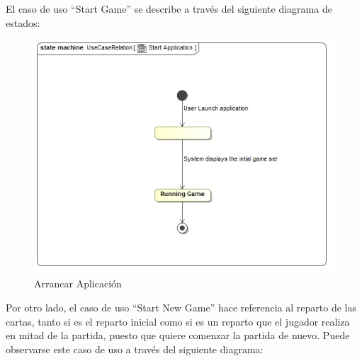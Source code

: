 \documentclass[11pt]{article}
\begin{document}
El caso de uso ``Start Game'' se describe a través del siguiente diagrama de estados:

\begin{center}
 \begin{figure}[H]
 \begin{center}
   \includegraphics[width=15cm]{DomainModel/StartApplication00.jpg}
   \caption{Arrancar Aplicación}
   \label{fig:startapplication}
 \end{center}
 \end{figure}
\end{center}

Por otro lado, el caso de uso ``Start New Game'' hace referencia al reparto de las cartas, tanto si es el reparto inicial como si es un reparto que el jugador realiza en mitad de la partida, puesto que quiere comenzar la partida de nuevo. Puede observarse este caso de uso a través del siguiente diagrama:
\end{document}
